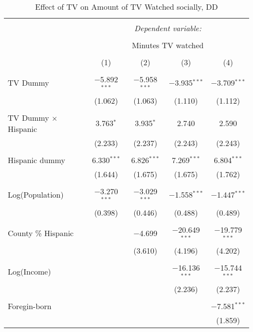 
\begin{table}[!htbp] \centering 
  \caption{Effect of TV on Amount of TV Watched socially, DD} 
  \label{} 
\begin{tabular}{@{\extracolsep{-5pt}}lcccc} 
\\[-1.8ex]\hline 
\hline \\[-1.8ex] 
 & \multicolumn{4}{c}{\textit{Dependent variable:}} \\ 
\cline{2-5} 
\\[-1.8ex] & \multicolumn{4}{c}{Minutes TV watched} \\ 
\\[-1.8ex] & (1) & (2) & (3) & (4)\\ 
\hline \\[-1.8ex] 
 TV Dummy & $-$5.892$^{***}$ & $-$5.958$^{***}$ & $-$3.935$^{***}$ & $-$3.709$^{***}$ \\ 
  & (1.062) & (1.063) & (1.110) & (1.112) \\ 
  & & & & \\ 
 TV Dummy $\times$ Hispanic  & 3.763$^{*}$ & 3.935$^{*}$ & 2.740 & 2.590 \\ 
  & (2.233) & (2.237) & (2.243) & (2.243) \\ 
  & & & & \\ 
 Hispanic dummy & 6.330$^{***}$ & 6.826$^{***}$ & 7.269$^{***}$ & 6.804$^{***}$ \\ 
  & (1.644) & (1.675) & (1.675) & (1.762) \\ 
  & & & & \\ 
 Log(Population) & $-$3.270$^{***}$ & $-$3.029$^{***}$ & $-$1.558$^{***}$ & $-$1.447$^{***}$ \\ 
  & (0.398) & (0.446) & (0.488) & (0.489) \\ 
  & & & & \\ 
 County \% Hispanic &  & $-$4.699 & $-$20.649$^{***}$ & $-$19.779$^{***}$ \\ 
  &  & (3.610) & (4.196) & (4.202) \\ 
  & & & & \\ 
 Log(Income) &  &  & $-$16.136$^{***}$ & $-$15.744$^{***}$ \\ 
  &  &  & (2.236) & (2.237) \\ 
  & & & & \\ 
 Foregin-born &  &  &  & $-$7.581$^{***}$ \\ 
  &  &  &  & (1.859) \\ 

\end{tabular}
\end{table}
